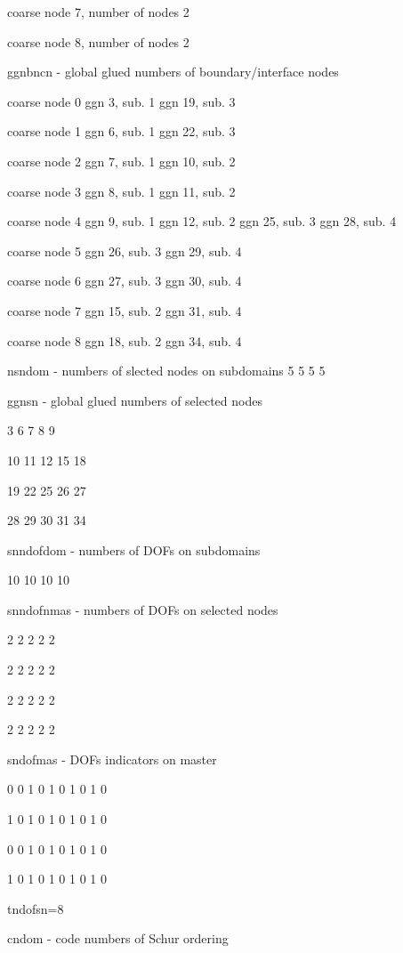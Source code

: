 coarse node      7, number of nodes  2

 coarse node      8, number of nodes  2


ggnbncn - global glued numbers of boundary/interface nodes

 coarse node      0   ggn      3, sub.   1   ggn     19, sub.   3

 coarse node      1   ggn      6, sub.   1   ggn     22, sub.   3

 coarse node      2   ggn      7, sub.   1   ggn     10, sub.   2

 coarse node      3   ggn      8, sub.   1   ggn     11, sub.   2

 coarse node      4   ggn      9, sub.   1   ggn     12, sub.   2   ggn     25, sub.   3   ggn     28, sub.   4

 coarse node      5   ggn     26, sub.   3   ggn     29, sub.   4

 coarse node      6   ggn     27, sub.   3   ggn     30, sub.   4

 coarse node      7   ggn     15, sub.   2   ggn     31, sub.   4

 coarse node      8   ggn     18, sub.   2   ggn     34, sub.   4


nsndom - numbers of slected nodes on subdomains
5 5 5 5

ggnsn - global glued numbers of selected nodes

  3  6  7  8  9

 10 11 12 15 18

 19 22 25 26 27

 28 29 30 31 34

snndofdom - numbers of DOFs on subdomains

10 10 10 10

snndofnmas - numbers of DOFs on selected nodes

2 2 2 2 2

2 2 2 2 2

2 2 2 2 2

2 2 2 2 2

sndofmas - DOFs indicators on master

  0  0
  1  0
  1  0
  1  0
  1  0

  1  0
  1  0
  1  0
  1  0
  1  0

  0  0
  1  0
  1  0
  1  0
  1  0

  1  0
  1  0
  1  0
  1  0
  1  0

tndofsn=8

cndom - code numbers of Schur ordering

